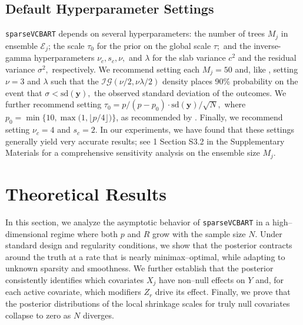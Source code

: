 \documentclass[11pt]{article}
\newcommand{\bcalE}{\boldsymbol{\mathcal{E}}}
\newcommand{\by}{\bm{y}}
\theoremstyle{plain}
\theoremstyle{definition}
\theoremstyle{plain}
\newcommand{\includesupp}{1}
\newcommand{\switchref}[2]{%
  \if\includesupp1%
    #1%
  \else%
    #2%
  \fi%
}
\begin{document}
\subsection{Default Hyperparameter Settings}
\label{sec:hyperparameters}

\texttt{sparseVCBART} depends on several hyperparameters: the number of trees $M_{j}$ in ensemble $\bcalE_{j}$; the scale $\tau_{0}$ for the prior on the global scale $\tau;$ and the inverse-gamma hyperparameters $\nu_{c}, s_{c}, \nu,$ and $\lambda$ for the slab variance $c^{2}$ and the residual variance $\sigma^{2},$ respectively. We recommend setting each $M_{j} = 50$ and, like \citet{Chipman2010}, setting $\nu = 3$ and $\lambda$ such that the $\mathcal{IG}(\nu/2, \nu\lambda/2)$ density places 90\% probability on the event that $\sigma < \textrm{sd}(\by),$ the observed standard deviation of the outcomes.
We further recommend setting \(\tau_{0} = {p}/{(p - p_0)}\cdot {\mathrm{sd}(\bm{y})}/{\sqrt{N}},\) where \(p_0 = \min\Big\{10, \max\big(1, \lfloor p/4 \rfloor\big)\Big\}\), as recommended by \citet{pmlr-v54-piironen17a}.
Finally, we recommend setting $\nu_{c} = 4$ and $s_{c} = 2$.
In our experiments, we have found that these settings generally yield very accurate results; see \switchref{}{Section S3.2 in the Supplementary Materials} for a comprehensive sensitivity analysis on the ensemble size $M_j$.





\section{Theoretical Results}
\label{sec:theory}
In this section, we analyze the asymptotic behavior of \texttt{sparseVCBART} in a high–dimensional regime where both $p$ and $R$ grow with the sample size $N$. 
Under standard design and regularity conditions, we show that the posterior contracts around the truth at a rate that is nearly minimax–optimal, while adapting to unknown sparsity and smoothness. 
We further establish that the posterior consistently identifies which covariates $X_j$ have non–null effects on $Y$ and, for each active covariate, which modifiers $Z_r$ drive its effect. 
Finally, we prove that the posterior distributions of the local shrinkage scales for truly null covariates collapse to zero as $N$ diverges.
\end{document}
